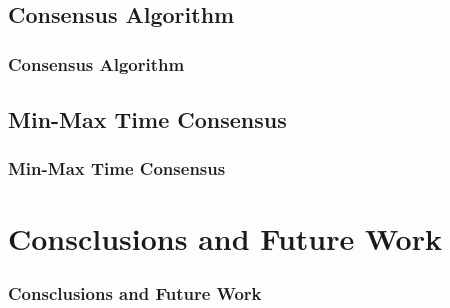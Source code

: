 \documentclass[10pt]{beamer}
\begin{document}
\subsection{Consensus Algorithm}
\begin{frame}
\frametitle{Consensus Algorithm}
\end{frame}

\subsection{Min-Max Time Consensus}
\begin{frame}
\frametitle{Min-Max Time Consensus}
\end{frame}


\section{Consclusions and Future Work}
\begin{frame}
\frametitle{Consclusions and Future Work}
\end{frame}

\end{document}
